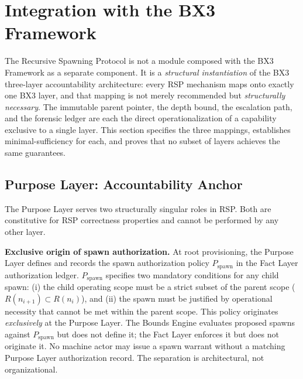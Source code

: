 \section{Integration with the BX3 Framework}
\label{sec:rs-integration}

The Recursive Spawning Protocol is not a module composed with the BX3 Framework as a separate component. It is a \textit{structural instantiation} of the BX3 three-layer accountability architecture: every RSP mechanism maps onto exactly one BX3 layer, and that mapping is not merely recommended but \textit{structurally necessary}. The immutable parent pointer, the depth bound, the escalation path, and the forensic ledger are each the direct operationalization of a capability exclusive to a single layer. This section specifies the three mappings, establishes minimal-sufficiency for each, and proves that no subset of layers achieves the same guarantees.

\subsection{Purpose Layer: Accountability Anchor}
\label{sec:rs-purpose-anchor}

The Purpose Layer serves two structurally singular roles in RSP. Both are constitutive for RSP correctness properties and cannot be performed by any other layer.

\medskip
\noindent\textbf{Exclusive origin of spawn authorization.} At root provisioning, the Purpose Layer defines and records the spawn authorization policy $P_{\mathrm{spawn}}$ in the Fact Layer authorization ledger. $P_{\mathrm{spawn}}$ specifies two mandatory conditions for any child spawn: (i) the child operating scope must be a strict subset of the parent scope ($R(n_{i+1}) \subset R(n_i)$), and (ii) the spawn must be justified by operational necessity that cannot be met within the parent scope. This policy originates \textit{exclusively} at the Purpose Layer. The Bounds Engine evaluates proposed spawns against $P_{\mathrm{spawn}}$ but does not define it; the Fact Layer enforces it but does not originate it. No machine actor may issue a spawn warrant without a matching Purpose Layer authorization record. The separation is architectural, not organizational.

